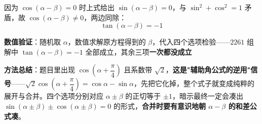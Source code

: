 \begin{answer}
因为 $\cos(\alpha-\beta)=0$ 时上式给出 $\sin(\alpha-\beta)=0$，与 $\sin^2+\cos^2=1$ 矛盾，故 $\cos(\alpha-\beta)\ne0$，两边同除：
\nopagebreak[4]
\[\tan(\alpha-\beta)=-1\]

\textbf{数值验证}：随机取 $\alpha$，数值求解原方程得到的 $\beta$，代入四个选项检验——$2261$ 组解中 $\tan(\alpha-\beta)=-1$ 全部成立，其余三项\textbf{一次都没成立} 

\begin{gktip}
\textbf{方法总结}：题目里出现 $\cos\left(\alpha+\dfrac\pi4\right)$ 且系数带 $\sqrt2$，\textbf{这是"辅助角公式的逆用"信号}——$\sqrt2\cos\left(\alpha+\dfrac\pi4\right)=\cos\alpha-\sin\alpha$，先把它化掉，整个式子就变成纯粹的展开与合并。四个选项分别对应 $\alpha\pm\beta$ 的正切等于 $\pm1$，暗示最终一定会凑出 $\sin(\alpha\pm\beta)\pm\cos(\alpha\pm\beta)=0$ 的形式，\textbf{合并时要有意识地朝 $\alpha-\beta$ 的和差公式凑}。
\end{gktip}


\par\medskip

\end{answer}
